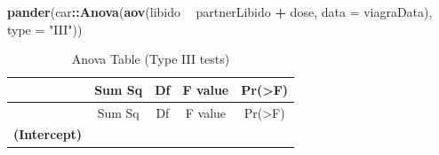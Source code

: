 \documentclass[]{article}
\newenvironment{Shaded}{\begin{snugshade}}{\end{snugshade}}
\newcommand{\DataTypeTok}[1]{\textcolor[rgb]{0.13,0.29,0.53}{#1}}
\newcommand{\KeywordTok}[1]{\textcolor[rgb]{0.13,0.29,0.53}{\textbf{#1}}}
\newcommand{\NormalTok}[1]{#1}
\newcommand{\OperatorTok}[1]{\textcolor[rgb]{0.81,0.36,0.00}{\textbf{#1}}}
\newcommand{\StringTok}[1]{\textcolor[rgb]{0.31,0.60,0.02}{#1}}
\begin{document}
\begin{Shaded}
\begin{Highlighting}[]
    \KeywordTok{pander}\NormalTok{(car}\OperatorTok{::}\KeywordTok{Anova}\NormalTok{(}\KeywordTok{aov}\NormalTok{(libido }\OperatorTok{~}\StringTok{ }\NormalTok{partnerLibido }\OperatorTok{+}\StringTok{ }\NormalTok{dose, }\DataTypeTok{data =}\NormalTok{ viagraData), }\DataTypeTok{type =} \StringTok{"III"}\NormalTok{))}
\end{Highlighting}
\end{Shaded}

\begin{longtable}[]{@{}ccccc@{}}
\caption{Anova Table (Type III tests)}\tabularnewline
\toprule
\begin{minipage}[b]{0.24\columnwidth}\centering
~\strut
\end{minipage} & \begin{minipage}[b]{0.11\columnwidth}\centering
Sum Sq\strut
\end{minipage} & \begin{minipage}[b]{0.06\columnwidth}\centering
Df\strut
\end{minipage} & \begin{minipage}[b]{0.12\columnwidth}\centering
F value\strut
\end{minipage} & \begin{minipage}[b]{0.12\columnwidth}\centering
Pr(\textgreater{}F)\strut
\end{minipage}\tabularnewline
\midrule
\endfirsthead
\toprule
\begin{minipage}[b]{0.24\columnwidth}\centering
~\strut
\end{minipage} & \begin{minipage}[b]{0.11\columnwidth}\centering
Sum Sq\strut
\end{minipage} & \begin{minipage}[b]{0.06\columnwidth}\centering
Df\strut
\end{minipage} & \begin{minipage}[b]{0.12\columnwidth}\centering
F value\strut
\end{minipage} & \begin{minipage}[b]{0.12\columnwidth}\centering
Pr(\textgreater{}F)\strut
\end{minipage}\tabularnewline
\midrule
\endhead
\begin{minipage}[t]{0.24\columnwidth}\centering
\textbf{(Intercept)}\strut
\end{minipage} & \begin{minipage}[t]{0.11\columnwidth}\centering

\end{minipage}
\end{longtable}
\end{document}
